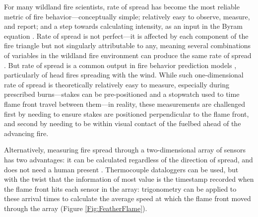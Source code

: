 \documentclass[fire,article,accept,oneauthor,pdftex]{Definitions/mdpi}
\begin{document}
For many wildland fire scientists, rate of spread has become the most reliable metric of fire behavior---conceptually simple; relatively easy to observe, measure, and report; and a step towards calculating intensity, as an input in the Byram equation \cite{byram1959}. 
Rate of spread is not perfect---it is affected by each component of the fire triangle but not singularly attributable to any, meaning several combinations of variables in the wildland fire environment can produce the same rate of spread \cite{finney2021}. 
But rate of spread is a common output in fire behavior prediction models \cite{perry1998, cruz2018}, particularly of head fires spreading with the wind. 
While such one-dimensional rate of spread is theoretically relatively easy to measure, especially during prescribed burns---stakes can be pre-positioned and a stopwatch used to time flame front travel between them---in reality, these measurements are challenged first by needing to ensure stakes are positioned perpendicular to the flame front, and second by needing to be within visual contact of the fuelbed ahead of the advancing fire.

Alternatively, measuring fire spread through a two-dimensional array of sensors has two advantages: it can be calculated regardless of the direction of spread, and does not need a human present \cite{finney2021}.
Thermocouple dataloggers can be used, but with the twist that the information of most value is the timestamp recorded when the flame front hits each sensor in the array: trigonometry can be applied to these arrival times to calculate the average speed at which the flame front moved through the array \cite{simard1982, simard1984, clements2019, mcgranahan2021, mcgranahan2023} (Figure \ref{Fig:FeatherFlame}). 
\end{document}
